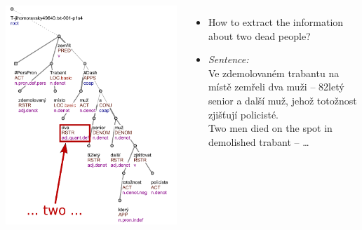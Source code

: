 \documentclass[xcolor=dvipsnames]{beamer}
\begin{document}
\begin{frame}[plain]
\begin{columns}
\centerline{\includegraphics[height=0.95\vsize]{img/Two_Tree}}
\begin{itemize}
	\item How to extract the information about \alert{two dead} people?
\bigskip
	\item \emph{Sentence:}
\medskip
{\small
\\Ve zdemolovaném trabantu na místě \alert{zemřeli dva muži} -- 82letý senior a další muž, jehož totožnost zjišťují policisté.
\medskip
\\\alert{Two men died} on the spot in demolished trabant -- \dots }
\end{itemize}
\vspace{2cm}
\end{columns}
\end{frame}
\end{document}
